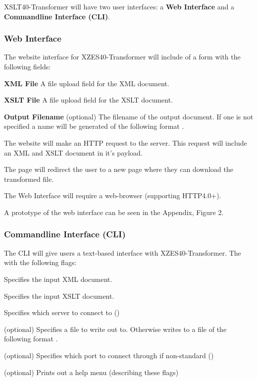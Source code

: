 XSLT40-Transformer will have two user interfaces: a \textbf{Web Interface} and a \textbf{Commandline Interface (CLI)}.

\subsubsection{Web Interface}

The website interface for XZES40-Transformer will include of a form with the following fields:
\begin{description}
  \item {
    \textbf{XML File} A file upload field for the XML document.
  }
  \item {
    \textbf{XSLT File} A file upload field for the XSLT document.
  }
  \item {
    \textbf{Output Filename} (optional)
    The filename of the output document.
    If one is not specified a name will be generated of the following format .
  }
\end{description}

The website will make an HTTP  request to the server.
This  request will include an XML and XSLT document in it's payload.

The page will redirect the user to a new page where they can download the transformed file.

The Web Interface will require a web-browser (supporting HTTP4.0+).

A prototype of the web interface can be seen in the Appendix, Figure 2.

\subsubsection{Commandline Interface (CLI)}

The CLI will give users a text-based interface with XZES40-Transformer.
The with the following flags:
\begin{description}
    \item {
      \textbf{}
      Specifies the input XML document.
    }
    \item {
      \textbf{}
      Specifies the input XSLT document.
    }
    \item {
      \textbf{}
      Specifies which server to connect to ()
    }
    \item {
      \textbf{} (optional)
      Specifies a file to write out to.  Otherwise writes to a file of the following format .
    }
    \item {
      \textbf{} (optional)
      Specifies which port to connect through if non-standard ()
    }
    \item {
      \textbf{} (optional)
      Prints out a help menu (describing these flags)
    }
\end{description}

